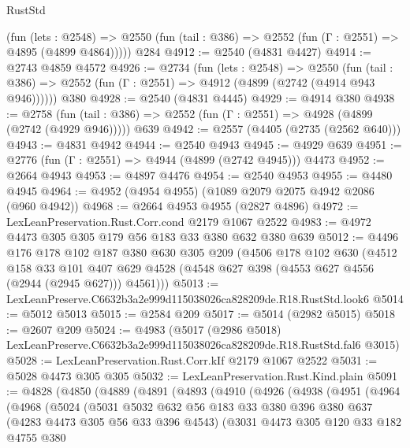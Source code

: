 \begin{lexlean}{RustStd}
\begin{coremodule}
      (fun (lets : @2548) =>
      @2550 (fun (tail : @386) => @2552 (fun (Γ : @2551) => @4895 (@4899 @4864)))))
    @284
@4912 := @2540 (@4831 @4427)
@4914 := @2743 @4859 @4572
@4926 := @2734
    (fun (lets : @2548) =>
    @2550 (fun (tail : @386) => @2552 (fun (Γ : @2551) => @4912 (@4899 (@2742 (@4914 @943 @946))))))
    @380
@4928 := @2540 (@4831 @4445)
@4929 := @4914 @380
@4938 := @2758
    (fun (tail : @386) => @2552 (fun (Γ : @2551) => @4928 (@4899 (@2742 (@4929 @946)))))
    @639
@4942 := @2557 (@4405 (@2735 (@2562 @640)))
@4943 := @4831 @4942
@4944 := @2540 @4943
@4945 := @4929 @639
@4951 := @2776 (fun (Γ : @2551) => @4944 (@4899 (@2742 @4945))) @4473
@4952 := @2664 @4943
@4953 := @4897 @4476
@4954 := @2540 @4953
@4955 := @4480 @4945
@4964 := @4952 (@4954 @4955) (@1089 @2079 @2075 @4942 @2086 (@960 @4942))
@4968 := @2664 @4953 @4955 (@2827 @4896)
@4972 := LexLeanPreservation.Rust.Corr.cond @2179 @1067 @2522
@4983 := @4972 @4473 @305 @305 @179 @56 @183 @33 @380 @632 @380 @639
@5012 := @4496
    @176
    @178
    @102
    @187
    @380
    @630
    @305
    @209
    (@4506
      @178
      @102
      @630
      (@4512
        @158
        @33
        @101
        @407
        @629
        @4528
        (@4548 @627 @398 (@4553 @627 @4556 (@2944 (@2945 @627))) @4561)))
@5013 := LexLeanPreserve.C6632b3a2e999d115038026ca828209de.R18.RustStd.look6
@5014 := @5012 @5013
@5015 := @2584 @209
@5017 := @5014 (@2982 @5015)
@5018 := @2607 @209
@5024 := @4983
    (@5017 (@2986 @5018) LexLeanPreserve.C6632b3a2e999d115038026ca828209de.R18.RustStd.fal6 @3015)
@5028 := LexLeanPreservation.Rust.Corr.kIf @2179 @1067 @2522
@5031 := @5028 @4473 @305 @305
@5032 := LexLeanPreservation.Rust.Kind.plain
@5091 := @4828
    (@4850
      (@4889
        (@4891
          (@4893
            (@4910
              (@4926
                (@4938
                  (@4951
                    (@4964
                      (@4968
                        (@5024
                          (@5031
                            @5032
                            @632
                            @56
                            @183
                            @33
                            @380
                            @396
                            @380
                            @637
                            (@4283 @4473 @305 @56 @33 @396 @4543)
                            (@3031
                              @4473
                              @305
                              @120
                              @33
                              @182
                              @4755
                              @380

\end{coremodule}
\end{lexlean}
